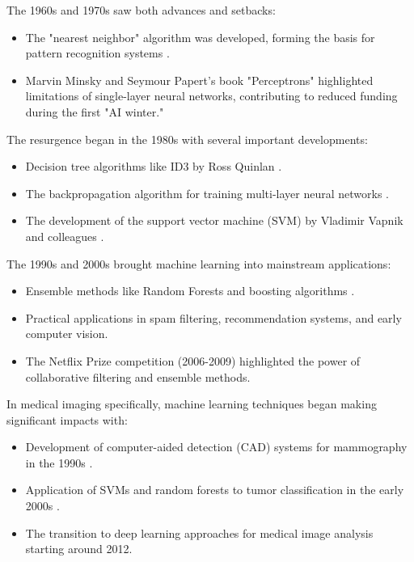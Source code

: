 The 1960s and 1970s saw both advances and setbacks:
\begin{itemize}
  \item The "nearest neighbor" algorithm was developed, forming the basis for pattern recognition systems \cite{cover1967nearest}.
  \item Marvin Minsky and Seymour Papert's book "Perceptrons" \cite{minsky1969perceptrons} highlighted limitations of single-layer neural networks, contributing to reduced funding during the first "AI winter."
\end{itemize}

The resurgence began in the 1980s with several important developments:
\begin{itemize}
  \item Decision tree algorithms like ID3 by Ross Quinlan \cite{quinlan1986induction}.
  \item The backpropagation algorithm for training multi-layer neural networks \cite{rumelhart1986learning}.
  \item The development of the support vector machine (SVM) by Vladimir Vapnik and colleagues \cite{vapnik1995nature}.
\end{itemize}

The 1990s and 2000s brought machine learning into mainstream applications:
\begin{itemize}
  \item Ensemble methods like Random Forests \cite{breiman2001random} and boosting algorithms \cite{freund1997decision}.
  \item Practical applications in spam filtering, recommendation systems, and early computer vision.
  \item The Netflix Prize competition (2006-2009) highlighted the power of collaborative filtering and ensemble methods.
\end{itemize}

In medical imaging specifically, machine learning techniques began making significant impacts with:
\begin{itemize}
  \item Development of computer-aided detection (CAD) systems for mammography in the 1990s \cite{chan1990computer}.
  \item Application of SVMs and random forests to tumor classification in the early 2000s \cite{zhang2004breast}.
  \item The transition to deep learning approaches for medical image analysis starting around 2012.
\end{itemize}


